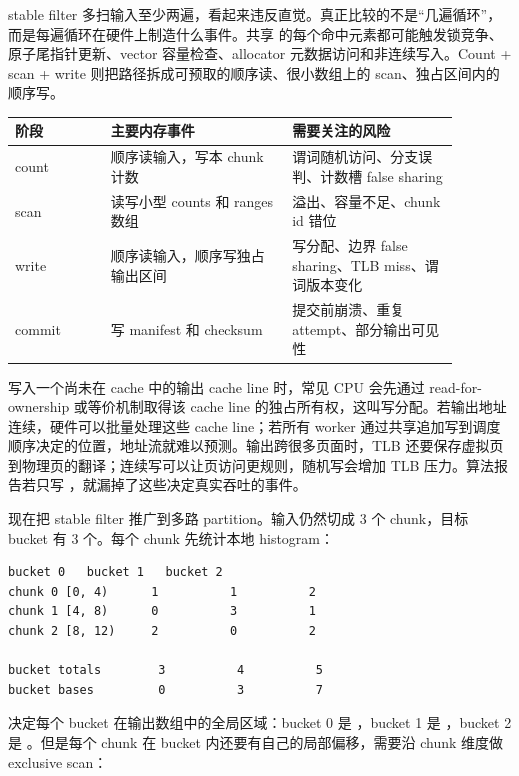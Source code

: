 stable filter 多扫输入至少两遍，看起来违反直觉。真正比较的不是“几遍循环”，而是每遍循环在硬件上制造什么事件。共享  的每个命中元素都可能触发锁竞争、原子尾指针更新、vector 容量检查、allocator 元数据访问和非连续写入。Count + scan + write 则把路径拆成可预取的顺序读、很小数组上的 scan、独占区间内的顺序写。

\begin{center}
\begin{tabular}{p{0.19\linewidth}p{0.36\linewidth}p{0.33\linewidth}}
\toprule
阶段 & 主要内存事件 & 需要关注的风险 \\
\midrule
count & 顺序读输入，写本 chunk 计数 & 谓词随机访问、分支误判、计数槽 false sharing \\
scan & 读写小型 counts 和 ranges 数组 & 溢出、容量不足、chunk id 错位 \\
write & 顺序读输入，顺序写独占输出区间 & 写分配、边界 false sharing、TLB miss、谓词版本变化 \\
commit & 写 manifest 和 checksum & 提交前崩溃、重复 attempt、部分输出可见性 \\
\bottomrule
\end{tabular}
\end{center}

写入一个尚未在 cache 中的输出 cache line 时，常见 CPU 会先通过 read-for-ownership 或等价机制取得该 cache line 的独占所有权，这叫写分配。若输出地址连续，硬件可以批量处理这些 cache line；若所有 worker 通过共享追加写到调度顺序决定的位置，地址流就难以预测。输出跨很多页面时，TLB 还要保存虚拟页到物理页的翻译；连续写可以让页访问更规则，随机写会增加 TLB 压力。算法报告若只写 ，就漏掉了这些决定真实吞吐的事件。

现在把 stable filter 推广到多路 partition。输入仍然切成 3 个 chunk，目标 bucket 有 3 个。每个 chunk 先统计本地 histogram：

\begin{lstlisting}[numbers=none,caption={multiway partition 的 counts 矩阵}]
                 bucket 0   bucket 1   bucket 2
chunk 0 [0, 4)      1          1          2
chunk 1 [4, 8)      0          3          1
chunk 2 [8, 12)     2          0          2

bucket totals        3          4          5
bucket bases         0          3          7
\end{lstlisting}

 决定每个 bucket 在输出数组中的全局区域：bucket 0 是 \code{[0, 3)}，bucket 1 是 \code{[3, 7)}，bucket 2 是 \code{[7, 12)}。但是每个 chunk 在 bucket 内还要有自己的局部偏移，需要沿 chunk 维度做 exclusive scan：

